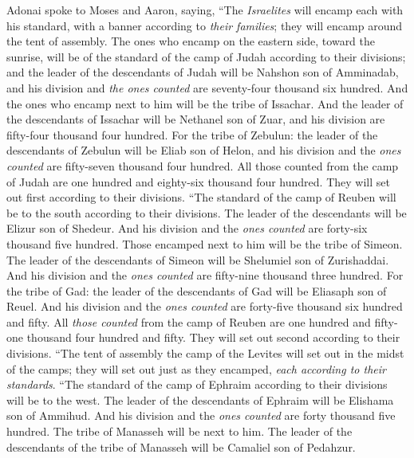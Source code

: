 \begin{biblechapter} %
 Adonai spoke to Moses and Aaron, saying,
\verse “The \textit{Israelites} will encamp each with his standard, with a banner according to \textit{their families}; they will encamp around the tent of assembly.
\verse The ones who encamp on the eastern side, toward the sunrise, will be of the standard of the camp of Judah according to their divisions; and the leader of the descendants of Judah will be Nahshon son of Amminadab,
\verse and his division and \textit{the ones counted} are seventy-four thousand six hundred.
\verse And the ones who encamp next to him will be the tribe of Issachar. And the leader of the descendants of Issachar will be Nethanel son of Zuar,
\verse and his division are fifty-four thousand four hundred.
\verse For the tribe of Zebulun: the leader of the descendants of Zebulun will be Eliab son of Helon,
\verse and his division and the \textit{ones counted} are fifty-seven thousand four hundred.
\verse All those counted from the camp of Judah are one hundred and eighty-six thousand four hundred. They will set out first according to their divisions.
\verse “The standard of the camp of Reuben will be to the south according to their divisions. The leader of the descendants will be Elizur son of Shedeur.
\verse And his division and the \textit{ones counted} are forty-six thousand five hundred.
\verse Those encamped next to him will be the tribe of Simeon. The leader of the descendants of Simeon will be Shelumiel son of Zurishaddai.
\verse And his division and the \textit{ones counted} are fifty-nine thousand three hundred.
\verse For the tribe of Gad: the leader of the descendants of Gad will be Eliasaph son of Reuel.
\verse And his division and the \textit{ones counted} are forty-five thousand six hundred and fifty.
\verse All \textit{those counted} from the camp of Reuben are one hundred and fifty-one thousand four hundred and fifty. They will set out second according to their divisions.
\verse “The tent of assembly the camp of the Levites will set out in the midst of the camps; they will set out just as they encamped, \textit{each according to their standards}.
\verse “The standard of the camp of Ephraim according to their divisions will be to the west. The leader of the descendants of Ephraim will be Elishama son of Ammihud.
\verse And his division and the \textit{ones counted} are forty thousand five hundred.
\verse The tribe of Manasseh will be next to him. The leader of the descendants of the tribe of Manasseh will be Camaliel son of Pedahzur.

\end{biblechapter}
